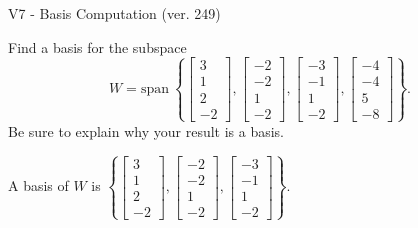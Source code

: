 \begin{exercise}
  \begin{exerciseTitle}V7 - Basis Computation (ver. 249)\end{exerciseTitle}
  \begin{exerciseStatement}
    Find a basis for the subspace 
\[W=\mathrm{span}\ \left\{\left[\begin{array}{r}
3 \\
1 \\
2 \\
-2
\end{array}\right] , \left[\begin{array}{r}
-2 \\
-2 \\
1 \\
-2
\end{array}\right] , \left[\begin{array}{r}
-3 \\
-1 \\
1 \\
-2
\end{array}\right] , \left[\begin{array}{r}
-4 \\
-4 \\
5 \\
-8
\end{array}\right]\right\}.\]
 Be sure to explain why your result is a basis.


  \end{exerciseStatement}
  \begin{exerciseAnswer}
   A basis of \(W\) is  \(\left\{\left[\begin{array}{r}
3 \\
1 \\
2 \\
-2
\end{array}\right] , \left[\begin{array}{r}
-2 \\
-2 \\
1 \\
-2
\end{array}\right] , \left[\begin{array}{r}
-3 \\
-1 \\
1 \\
-2
\end{array}\right]\right\}\).
  


  \end{exerciseAnswer}
\end{exercise}